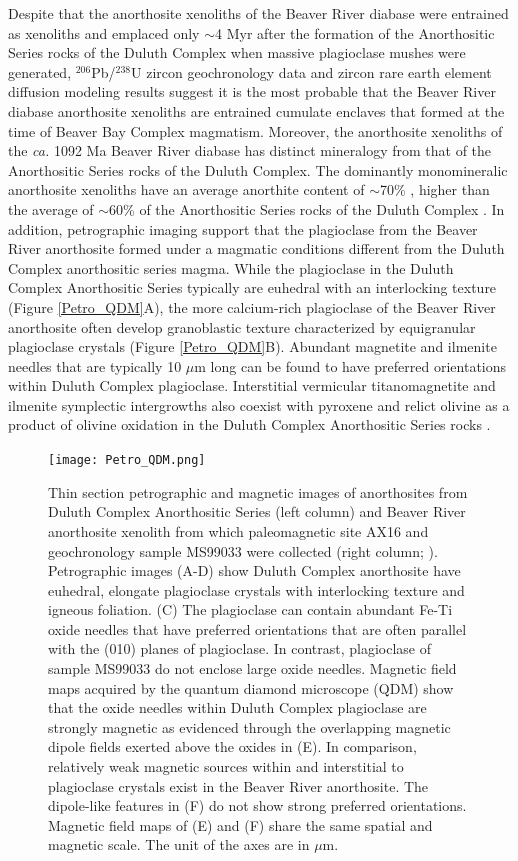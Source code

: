 \documentclass[draft]{agujournal2019}
\begin{document}
Despite that the anorthosite xenoliths of the Beaver River diabase were entrained as xenoliths and emplaced only $\sim$4 Myr after the formation of the Anorthositic Series rocks of the Duluth Complex when massive plagioclase mushes were generated, $^{206}$Pb/$^{238}$U zircon geochronology data and zircon rare earth element diffusion modeling results suggest it is the most probable that the Beaver River diabase anorthosite xenoliths are entrained cumulate enclaves that formed at the time of Beaver Bay Complex magmatism. Moreover, the anorthosite xenoliths of the \textit{ca.} 1092 Ma Beaver River diabase has distinct mineralogy from that of the Anorthositic Series rocks of the Duluth Complex. The dominantly monomineralic anorthosite xenoliths have an average anorthite content of $\sim$70\% \cite{Morrison1983a, Doyle2016a}, higher than the average of $\sim$60\% of the Anorthositic Series rocks of the Duluth Complex \cite{Miller1990a}. In addition, petrographic imaging support that the plagioclase from the Beaver River anorthosite formed under a magmatic conditions different from the Duluth Complex anorthositic series magma. While the plagioclase in the Duluth Complex Anorthositic Series typically are euhedral with an interlocking texture (Figure \ref{Petro_QDM}A), the more calcium-rich plagioclase of the Beaver River anorthosite often develop granoblastic texture characterized by equigranular plagioclase crystals (Figure \ref{Petro_QDM}B). Abundant magnetite and ilmenite needles that are typically 10 $\mu$m long can be found to have preferred orientations within Duluth Complex plagioclase. Interstitial vermicular titanomagnetite and ilmenite symplectic intergrowths also coexist with pyroxene and relict olivine as a product of olivine oxidation in the Duluth Complex Anorthositic Series rocks \cite{Miller1990a}. 

\begin{figure}
\noindent\texttt{[image: Petro\_QDM.png]}
\caption{\footnotesize{Thin section petrographic and magnetic images of anorthosites from Duluth Complex Anorthositic Series (left column) and Beaver River anorthosite xenolith from which paleomagnetic site AX16 and geochronology sample MS99033 were collected (right column; ). Petrographic images (A-D) show Duluth Complex anorthosite have euhedral, elongate plagioclase crystals with interlocking texture and igneous foliation. (C) The plagioclase can contain abundant Fe-Ti oxide needles that have preferred orientations that are often parallel with the (010) planes of plagioclase. In contrast, plagioclase of sample MS99033 do not enclose large oxide needles. Magnetic field maps acquired by the quantum diamond microscope (QDM) show that the oxide needles within Duluth Complex plagioclase are strongly magnetic as evidenced through the overlapping magnetic dipole fields exerted above the oxides in (E). In comparison, relatively weak magnetic sources within and interstitial to plagioclase crystals exist in the Beaver River anorthosite. The dipole-like features in (F) do not show strong preferred orientations. Magnetic field maps of (E) and (F) share the same spatial and magnetic scale. The unit of the axes are in $\mu$m.}}
\label{fig:Petro_QDM}
\end{figure}
\end{document}
